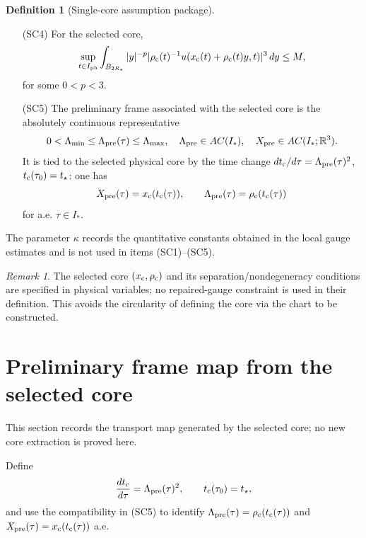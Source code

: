 \documentclass[11pt]{amsart}
\theoremstyle{plain}
\theoremstyle{definition}
\newtheorem{definition}[theorem]{Definition}
\theoremstyle{remark}
\newtheorem{remark}[theorem]{Remark}
\newcommand{\RR}{\mathbb R}
\begin{document}
\begin{definition}[Single-core assumption package]
\begin{enumerate}
\[  \ge \eta.
  \]
  This is the quantitative non-competing core condition, and is imposed on the
  selected physical core directly; it is not a consequence of the repaired-gauge
  construction.
\item[(\textup{SC4})] For the selected core,
  \[
  \sup_{t\in I_{\rm ph}}\int_{B_{2R_*}}|y|^{-p}|\rho_{\rm c}(t)^{-1}u(x_{\rm c}(t)+\rho_{\rm c}(t) y,t)|^3\,dy\le M,
  \]
  for some \(0<p<3\).
\item[(\textup{SC5})] The preliminary frame associated with the selected core is
  the absolutely continuous representative
  \[
  0<\Lambda_{\min}\le \Lambda_{\rm pre}(\tau)\le \Lambda_{\max},\quad
  \Lambda_{\rm pre}\in AC(I_*),\quad
  X_{\rm pre}\in AC(I_*;\RR^3).
  \]
  It is tied to the selected physical core by the time change
  \(dt_{\rm c}/d\tau=\Lambda_{\rm pre}(\tau)^2\), \(t_{\rm c}(\tau_0)=t_\star\):
  one has
  \[
  X_{\rm pre}(\tau)=x_{\rm c}(t_{\rm c}(\tau)),\qquad
  \Lambda_{\rm pre}(\tau)=\rho_{\rm c}(t_{\rm c}(\tau))
  \]
  for a.e. \(\tau\in I_*\).
\end{enumerate}
\end{definition}
\noindent
The parameter \(\kappa\) records the quantitative constants obtained in the local gauge estimates and is not used in items \textup{(SC1)--(SC5)}.

\begin{remark}
The selected core \((x_{\rm c},\rho_{\rm c})\) and its separation/nondegeneracy
conditions are specified in physical variables; no repaired-gauge constraint is used in
their definition.  This avoids the circularity of defining the core via the chart
to be constructed.
\end{remark}

\section{Preliminary frame map from the selected core}\label{sec:preliminary-frame}

This section records the transport map generated by the selected core; no new core extraction
is proved here.

Define
\[
\frac{dt_{\rm c}}{d\tau}=\Lambda_{\rm pre}(\tau)^2,\qquad t_{\rm c}(\tau_0)=t_\star,
\]
and use the compatibility in \textup{(SC5)} to identify
\(\Lambda_{\rm pre}(\tau)=\rho_{\rm c}(t_{\rm c}(\tau))\) and
\(X_{\rm pre}(\tau)=x_{\rm c}(t_{\rm c}(\tau))\) a.e.
\end{document}
